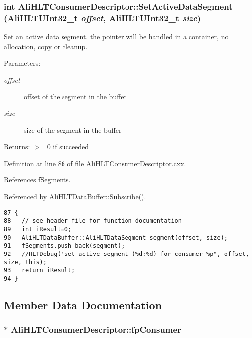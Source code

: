 \subsubsection{\setlength{\rightskip}{0pt plus 5cm}int Ali\-HLTConsumer\-Descriptor::Set\-Active\-Data\-Segment ({\bf Ali\-HLTUInt32\_\-t} {\em offset}, {\bf Ali\-HLTUInt32\_\-t} {\em size})}\label{classAliHLTConsumerDescriptor_a6}


Set an active data segment. the pointer will be handled in a container, no allocation, copy or cleanup. \begin{Desc}
\item[Parameters:]
\begin{description}
\item[{\em offset}]offset of the segment in the buffer \item[{\em size}]size of the segment in the buffer \end{description}
\end{Desc}
\begin{Desc}
\item[Returns:]$>$=0 if succeeded \end{Desc}


Definition at line 86 of file Ali\-HLTConsumer\-Descriptor.cxx.

References f\-Segments.

Referenced by Ali\-HLTData\-Buffer::Subscribe().

\footnotesize\begin{verbatim}87 {
88   // see header file for function documentation
89   int iResult=0;
90   AliHLTDataBuffer::AliHLTDataSegment segment(offset, size);
91   fSegments.push_back(segment);
92   //HLTDebug("set active segment (%d:%d) for consumer %p", offset, size, this);
93   return iResult;
94 }
\end{verbatim}\normalsize 




\subsection{Member Data Documentation}
\subsubsection{$\ast$ {\bf Ali\-HLTConsumer\-Descriptor::fp\-Consumer}\hspace{0.3cm}{\tt  [private]}}\label{classAliHLTConsumerDescriptor_r0}


